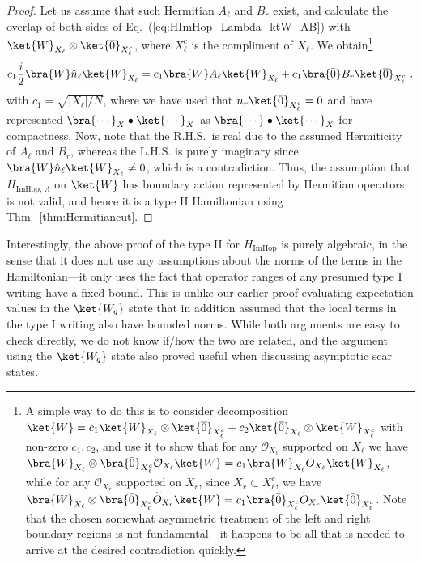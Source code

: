 \documentclass[prx,letterpaper,aps,superscriptaddress,floatfix,twocolumn,nofootinbib]{revtex4-2}
\theoremstyle{definition}
\newcommand{\ktO}{\ket{\overline{0}}}
\newcommand{\ktW}{\ket{W}}
\newcommand{\HImHopLambda}{H_{\text{ImHop},\, \Lambda}}
\begin{document}
\begin{proof}
%
Let us assume that such Hermitian $A_\ell$ and $B_r$ exist, and calculate the overlap of both sides of Eq.~(\ref{eq:HImHop_Lambda_ktW_AB}) with $\ktW_{X_\ell} \otimes \ktO_{X_\ell^c}$, where $X_\ell^c$ is the compliment of $X_\ell$.
We obtain\footnote{
A simple way to do this is to consider decomposition $\ktW = c_1 \ktW_{X_\ell} \otimes \ktO_{X_\ell^c} + c_2 \ktO_{X_\ell} \otimes \ktW_{X_\ell^c}$ with non-zero $c_1, c_2$, and use it to show that for any $\mathcal{O}_{X_\ell}$ supported on $X_\ell$ we have $\bra{W}_{X_\ell} \otimes \bra{\bar{0}}_{X_\ell^c} \mathcal{O}_{X_\ell} \ktW = c_1 \bra{W}_{X_\ell} O_{X_\ell} \ktW_{X_\ell}$, while for any $\widetilde{\mathcal{O}}_{X_r}$ supported on $X_r$, since $X_r \subset X_\ell^c$, we have $\bra{W}_{X_\ell} \otimes \bra{\bar{0}}_{X_\ell^c} \widetilde{O}_{X_r} \ktW = c_1 \bra{\bar{0}}_{X_\ell^c} \widetilde{O}_{X_r} \ket{\bar{0}}_{X_\ell^c}$.
Note that the chosen somewhat asymmetric treatment of the left and right boundary regions is not fundamental---it happens to be all that is needed to arrive at the desired contradiction quickly.
}
\begin{equation}
c_1 \frac{i}{2}\bra{W} \hat{n}_\ell \ktW_{X_\ell} = c_1 \bra{W}A_\ell \ktW_{X_\ell} + c_1 \bra{\bar{0}} B_r \ktO_{X_\ell^c} ~.
\end{equation}
with $c_1 = \sqrt{|X_\ell|/N}$, 
where we have used that $n_r \ktO_{X_\ell^c} = 0$ and have represented $\bra{\cdots}_X \bullet \ket{\cdots}_X$ as $\bra{\cdots} \bullet \ket{\cdots}_X$ for compactness.
Now, note that the R.H.S.\ is real due to the assumed Hermiticity of $A_\ell$ and $B_r$, whereas the L.H.S. is purely imaginary since  $\bra{W} \hat{n}_\ell \ktW_{X_\ell} \neq 0$, which is a contradiction.
%
Thus, the assumption that $\HImHopLambda$ on $\ktW$ has boundary action represented by Hermitian operators is not valid, and hence it is a type II Hamiltonian using Thm.~\ref{thm:Hermitiancut}.
\end{proof}
%

%
Interestingly, the above proof of the type II for $H_{\text{ImHop}}$ is purely algebraic, in the sense that it does not use any assumptions about the norms of the terms in the Hamiltonian---it only uses the fact that operator ranges of any presumed type I writing have a fixed bound.
%
This is unlike our earlier proof evaluating expectation values in the $\ket{W_q}$ state that in addition assumed that the local terms in the type I writing also have bounded norms.
%
While both arguments are easy to check directly, we do not know if/how the two are related, and the argument using the $\ket{W_q}$ state also proved useful when discussing asymptotic scar states.
%
\end{document}

